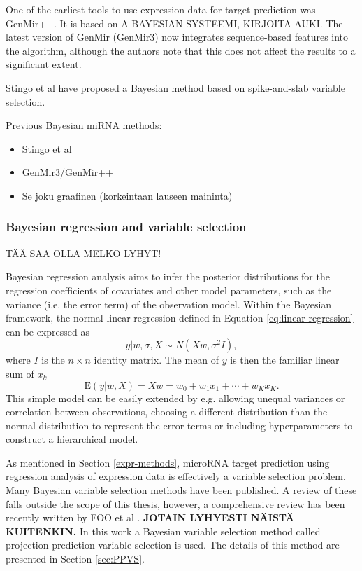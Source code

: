 
One of the earliest tools to use expression data for target prediction was
GenMir++. It is based on A BAYESIAN SYSTEEMI, KIRJOITA AUKI.
The latest version of GenMir (GenMir3) now integrates sequence-based features
into the algorithm, although the authors note that this does not affect the
results to a significant extent.

Stingo et al have proposed a Bayesian method based on spike-and-slab variable
selection.

Previous Bayesian miRNA methods:
\begin{itemize}
  \item Stingo et al
  \item GenMir3/GenMir++
  \item Se joku graafinen (korkeintaan lauseen maininta)
\end{itemize}


\subsubsection{Bayesian regression and variable selection}

TÄÄ SAA OLLA MELKO LYHYT!

Bayesian regression analysis aims to infer the posterior distributions
for the regression coefficients of covariates and other model parameters,
such as the variance (i.e. the error term) of the observation model.
Within the Bayesian framework, the normal linear regression defined in
Equation \ref{eq:linear-regression} can be expressed as
\begin{equation}
  y | w, \sigma, X \sim N(Xw, \sigma^2I),
\end{equation}
where $I$ is the $n \times n$ identity matrix. The mean of $y$ is then the
familiar linear sum of $x_k$
\begin{equation}
  \textrm{E}(y|w,X) = Xw = w_0 + w_1 x_1 + \dotsb + w_K x_K.
\end{equation}
This simple model can be easily extended by e.g. allowing unequal variances
or correlation between observations, choosing a different distribution
than the normal distribution to represent the error terms or
including hyperparameters to construct a hierarchical model.

As mentioned in Section \ref{expr-methods}, microRNA target prediction using
regression analysis of expression data is effectively a variable selection
problem. Many Bayesian variable selection methods have been published. A
review of these falls outside the scope of this thesis, however, a
comprehensive review has been recently written by FOO et al \citep{}.
\textbf{JOTAIN LYHYESTI NÄISTÄ KUITENKIN.}
In this work a Bayesian variable selection method called projection prediction
variable selection is used. The details of this method are presented in
Section \ref{sec:PPVS}.



